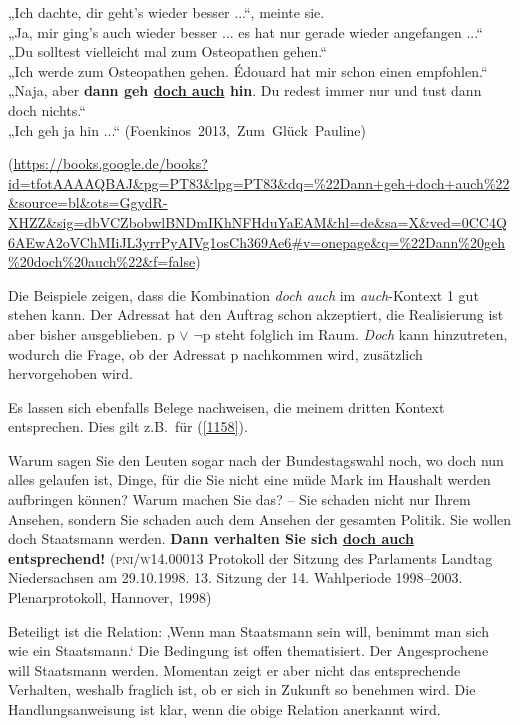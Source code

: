 \begin{exe}
	\ex\label{1156} 

	„Ich dachte, dir geht's wieder besser ...“, meinte sie.\\
	„Ja, mir ging's auch wieder besser ... es hat nur gerade wieder angefangen ...“\\
	„Du solltest vielleicht mal zum Osteopathen gehen.“\\
	„Ich werde zum Osteopathen gehen. Édouard hat mir schon einen empfohlen.“\\
	„Naja, aber \textbf{dann geh \ul{doch auch} hin}. Du redest immer nur und tust dann doch nichts.“\\	
	„Ich geh ja hin ...“
	\hfill\hbox{(Foenkinos 2013, Zum Glück Pauline)}
	\begin{sloppypar}
	{\scriptsize(\url{https://books.google.de/books?id=tfotAAAAQBAJ\&pg=PT83\&lpg=PT83\&dq=\%22Dann+geh+doch+auch\%22\&source=bl\&ots=GgydR-XHZZ\&sig=dbVCZbobwlBNDmIKhNFHduYaEAM\&hl=de\&sa=X\&ved=0CC4Q6AEwA2oVChMIiJL3yrrPyAIVg1osCh369Ae6\#v=onepage\&q=\%22Dann\%20geh\%20doch\%20auch\%22\&f=false})}\end{sloppypar}
\end{exe}
Die Beispiele zeigen, dass die Kombination \textit{doch auch} im \textit{auch}-Kontext 1 gut stehen kann. Der Adressat hat den Auftrag schon akzeptiert, die Realisierung ist aber bisher ausgeblieben. p $\vee$ $\neg$p steht folglich im Raum. \textit{Doch} kann hinzutreten, wodurch die Frage, ob der Adressat p nachkommen wird, zusätzlich hervorgehoben wird.

Es lassen sich ebenfalls Belege nachweisen, die meinem dritten Kontext entsprechen. Dies gilt z.B.\ für (\ref{1158}).

\begin{exe}
	\ex\label{1158} 

	Warum sagen Sie den Leuten sogar nach der Bundestagswahl noch, wo doch nun alles gelaufen ist, Dinge, für die Sie nicht eine müde Mark im Haushalt 			werden aufbringen können? Warum machen Sie das? – Sie schaden nicht nur Ihrem Ansehen, sondern Sie schaden auch dem Ansehen der gesamten Politik. Sie 		wollen doch Staatsmann werden. \textbf{Dann verhalten Sie sich \ul{doch auch} entsprechend!} 
	\newline
	(\textsc{pni/w14.00013} Protokoll der Sitzung des Parlaments Landtag Niedersachsen am 29.10.1998. 13. Sitzung der 14. Wahlperiode 1998--2003. Plenarprotokoll, Hannover, 1998)
\end{exe}
Beteiligt ist die Relation: ‚Wenn man Staatsmann sein will, benimmt man sich wie ein Staatsmann.‘ Die Bedingung ist offen thematisiert. Der Angespro\-chene will Staatsmann werden. Momentan zeigt er aber nicht das entsprechende Verhalten, weshalb fraglich ist, ob er sich in Zukunft so benehmen wird. Die Handlungsanweisung ist klar, wenn die obige Relation anerkannt wird.

